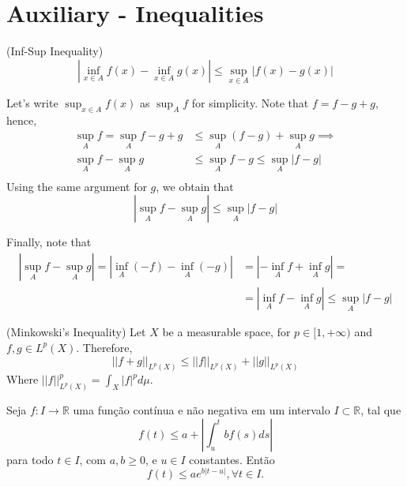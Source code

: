 \section{Auxiliary - Inequalities}

\begin{lemma}(Inf-Sup Inequality)
	\begin{equation}
		|\inf_{x \in A} f(x) - \inf_{x \in A} g(x)| \leq
		\sup_{x \in A}|f(x)- g(x)|
	\end{equation}
	\label{lem:infsup_ineq}
\end{lemma}
\begin{prf}
	Let's write $\sup_{x \in A}f(x)$ as $\sup_A f$ for simplicity.
	Note that $f = f - g + g$, hence,
	\begin{align*}
		\sup_A f = \sup_A f - g + g & \leq
		\sup_A (f-g) + \sup_A g \implies   \\
		\sup_A f - \sup_A g         & \leq
		\sup_A f-g \leq \sup_A |f-g|       \\
	\end{align*}
	Using the same argument for $g$, we obtain that
	\begin{equation}
		|\sup_A f - \sup_A g| \leq \sup_A |f-g|
	\end{equation}

	Finally, note that
	\begin{align*}
		|\sup_A f - \sup_A g| =
		|\inf_A (-f) - \inf_A (-g)| & =
		|-\inf_A f + \inf_A g| =                                                \\
		                            & =|\inf_A f - \inf_A g | \leq \sup_A |f-g|
	\end{align*}
\end{prf}

\begin{lemma} (Minkowski's Inequality)
	Let $X$ be a measurable space, for $p \in [1,+\infty)$ and $f,g \in L^p(X)$. Therefore,
	\begin{equation}
		||f + g||_{L^p(X)} \leq
		||f||_{L^p(X)} + 
		||g||_{L^p(X)}
	\end{equation}
	Where $||f||_{L^p(X)}^p = \int_X |f|^p d\mu$.
	\label{lem:minkowski}
\end{lemma}

\begin{lemma}
	Seja $f:I\to \mathbb R$ uma função contínua e não negativa
	em um intervalo $I\subset \mathbb R$, tal que
	\begin{equation}
		f(t) \leq a +\left | \int_u^t b f(s) ds\right|
	\end{equation}
	para todo $t\in I$, com $a,b\geq 0$, e $u \in I$ constantes. Então
	\begin{equation}
		f(t) \leq a e^{b|t-u|}, \forall t \in I.
	\end{equation}
\end{lemma}